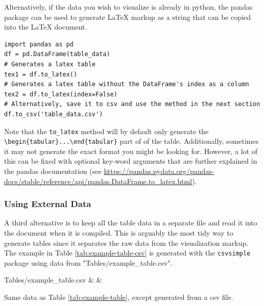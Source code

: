 Alternatively, if the data you wish to visualize is already in python, the pandas package can be used to generate LaTeX markup as a string that can be copied into the LaTeX document.

\begin{verbatim}
import pandas as pd 
df = pd.DataFrame(table_data)
# Generates a latex table
tex1 = df.to_latex()
# Generates a latex table without the DataFrame's index as a column
tex2 = df.to_latex(index=False)
# Alternatively, save it to csv and use the method in the next section
df.to_csv('table_data.csv')
\end{verbatim}

Note that the \verb|to_latex| method will by default only generate the \verb|\begin{tabular}...\end{tabular}| part of of the table. Additionally, sometimes it may not generate the exact format you might be looking for. However, a lot of this can be fixed with optional key-word arguments that are further explained in the pandas documentation (see  \url{https://pandas.pydata.org/pandas-docs/stable/reference/api/pandas.DataFrame.to_latex.html}).


\subsubsection{Using External Data}
\label{app:example-table-external}

A third alternative is to keep all the table data in a separate file and read it into the document when it is compiled.
This is arguably the most tidy way to generate tables since it separates the raw data from the visualization markup.
The example in Table \ref{tab:example-table-csv} is generated with the \verb|csvsimple| package using data from "Tables/example\_table.csv".

\begin{table}[H]
    \centering
    \csvreader[
      tabular=l|cc,
      table head=\toprule Statistics & Agent57 & R2D2 (bandit) \\\midrule,
      table foot=\bottomrule,
      head to column names,
      ]
      {Tables/example_table.csv}{}
      {\statistics & \csvcolii & \csvcoliii}
    \caption{Same data as Table \ref{tab:example-table}, except generated from a csv file.}
    \label{tab:example-table-csv}
\end{table}





